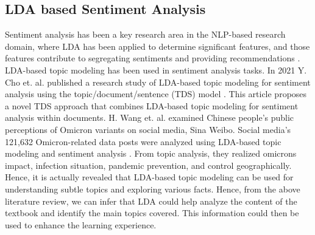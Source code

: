 \documentclass[sn-mathphys,Numbered]{sn-jnl}%
\theoremstyle{thmstyleone}%
\theoremstyle{thmstyletwo}%
\theoremstyle{thmstylethree}%
\begin{document}
\subsection{LDA based Sentiment Analysis}\label{sent_lda} 
Sentiment analysis has been a key research area in the NLP-based research domain, where LDA has been applied to determine significant features, and those features contribute to segregating sentiments and providing recommendations \cite{mujahid2021sentiment}. LDA-based topic modeling has been used in sentiment analysis tasks. In 2021 Y. Cho et. al. published a research study of LDA-based topic modeling for sentiment analysis using the topic/document/sentence (TDS) model \cite{farkhod_lda_based_2021}. This article proposes a novel TDS approach that combines LDA-based topic modeling for sentiment analysis within documents. H. Wang et. al. examined Chinese people's public perceptions of Omicron variants on social media, Sina Weibo. Social media's 121,632 Omicron-related data posts were analyzed using LDA-based topic modeling and sentiment analysis \cite{wang_exploring_2022}. From topic analysis, they realized omicron\textquotesingle s impact, infection situation, pandemic prevention, and control geographically. Hence, it is actually revealed that LDA-based topic modeling can be used for understanding subtle topics and exploring various facts. Hence, from the above literature review, we can infer that LDA could help analyze the content of the textbook and identify the main topics covered. This information could then be used to enhance the learning experience.\\
\end{document}
